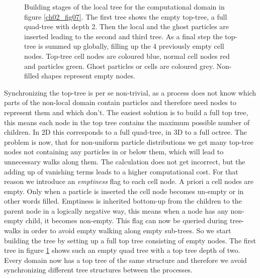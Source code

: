 \begin{figure}[htbp]
\begin{center}
\caption{Building stages of the local tree for the computational domain in figure \ref{ch02_fig07}. The first tree shows the empty top-tree, a full quad-tree with depth 2. Then the local and the ghost particles are inserted leading to the second and third tree. As a final step the top-tree is summed up globally, filling up the 4 previously empty cell nodes. Top-tree cell nodes are coloured blue, normal cell nodes red and particles green. Ghost particles or cells are coloured grey. Non-filled shapes represent empty nodes.}
\label{ch02_fig07b}
\end{center}
\end{figure}

Synchronizing the top-tree is per se non-trivial, as a process does not know which parts of the non-local domain contain particles and therefore need nodes to represent them and which don't. The easiest solution is to build a full top tree, this means each node in the top tree contains the maximum possible number of children. In 2D this corresponds to a full quad-tree, in 3D to a full octree. The problem is now, that for non-uniform particle distributions we get many top-tree nodes not containing any particles in or below them, which will lead to unnecessary walks along them. The calculation does not get incorrect, but the adding up of vanishing terms leads to a higher computational cost. For that reason we introduce an \emph{emptiness} flag to each cell node. A priori a cell nodes are empty. Only when a particle is inserted the cell node becomes un-empty or in other words filled. Emptiness is inherited bottom-up from the children to the parent node in a logically negative way, this means when a node has any non-empty child, it becomes non-empty. This flag can now be queried during tree-walks in order to avoid empty walking along empty sub-trees. So we start building the tree by setting up a full top tree consisting of empty nodes. The first tree in figure \ref{ch02_fig07b} shows such an empty quad tree with a top tree depth of two. Every domain now has a top tree of the same structure and therefore we avoid synchronizing different tree structures between the processes.

